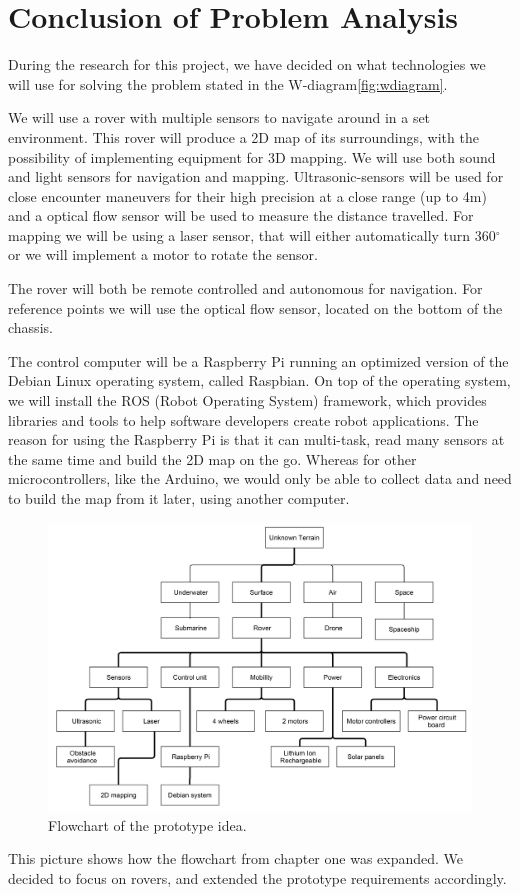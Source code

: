 \section{Conclusion of Problem Analysis}

During the research for this project, we have decided on what technologies we will use for solving the problem stated in the W-diagram\ref{fig:wdiagram}.

We will use a rover with multiple sensors to navigate around in a set environment. This rover will produce a 2D map of its surroundings, with the possibility of implementing equipment for 3D mapping. We will use both sound and light sensors for navigation and mapping. Ultrasonic-sensors will be used for close encounter maneuvers for their high precision at a close range (up to 4m)\cite{ultra} and a optical flow sensor will be used to measure the distance travelled. For mapping we will be using a laser sensor, that will either automatically turn 360$^{\circ}$ or we will implement a motor to rotate the sensor.

The rover will both be remote controlled and autonomous for navigation. For reference points we will use the optical flow sensor, located on the bottom of the chassis.

The control computer will be a Raspberry Pi running an optimized version of the Debian Linux operating system, called Raspbian. On top of the operating system, we will install the ROS (Robot Operating System) framework, which provides libraries and tools to help software developers create robot applications\cite{ros}. %
 The reason for using the Raspberry Pi is that it can multi-task, read many sensors at the same time and build the 2D map on the go. Whereas for other microcontrollers, like the Arduino, we would only be able to collect data and need to build the map from it later, using another computer.

\begin{figure}[H]
	\centering
	\includegraphics[scale=.1]{images/level3.png}
	\caption{Flowchart of the prototype idea.}
	\label{fig:level3}
\end{figure}

This picture shows how the flowchart from chapter one was expanded. We decided to focus on rovers, and extended the prototype requirements accordingly.

\clearpage
